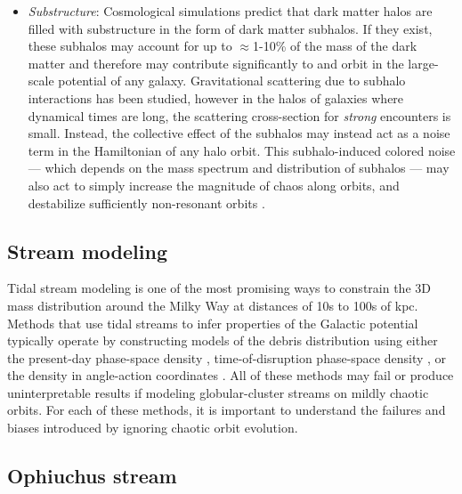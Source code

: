 \documentclass[letterpaper,12pt,preprint]{aastex}
\begin{document}
\begin{itemize}
\item \emph{Substructure}: Cosmological simulations predict that dark matter halos are filled with substructure in the form of dark matter subhalos. If they exist, these subhalos may account for up to $\approx$1-10\% of the mass of the dark matter \citep[e.g.,][]{diemand07} and therefore may contribute significantly to and orbit in the large-scale potential of any galaxy. Gravitational scattering due to subhalo interactions has been studied, however in the halos of galaxies where dynamical times are long, the scattering cross-section for \emph{strong} encounters is small. Instead, the collective effect of the subhalos may instead act as a noise term in the Hamiltonian of any halo orbit. This subhalo-induced colored noise --- which depends on the mass spectrum and distribution of subhalos --- may also act to simply increase the magnitude of chaos along orbits, and destabilize sufficiently non-resonant orbits \citep[see, e.g.,][]{kandrup00}.

\end{itemize}

\subsection{Stream modeling}

Tidal stream modeling is one of the most promising ways to constrain the 3D mass distribution around the Milky Way at distances of 10s to 100s of kpc. Methods that use tidal streams to infer properties of the Galactic potential typically operate by constructing models of the debris distribution using either the present-day phase-space density \citep[e.g.,][]{kuepper12, kuepper15, gibbons14}, time-of-disruption phase-space density \citep{apw13, apw14}, or the density in angle-action coordinates \citep{sanders14, bovy14}. All of these methods may fail or produce uninterpretable results if modeling globular-cluster streams on mildly chaotic orbits. For each of these methods, it is important to understand the failures and biases introduced by ignoring chaotic orbit evolution.

\subsection{Ophiuchus stream}
\end{document}
